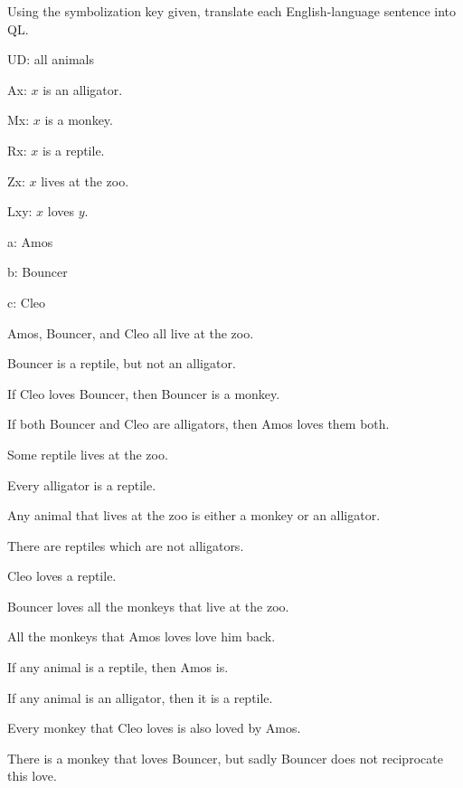 \solutions
\problempart
\label{pr.QLalligators}
Using the symbolization key given, translate each English-language sentence into QL.
\begin{ekey}
\item[UD:] all animals
\item[Ax:] $x$ is an alligator.
\item[Mx:] $x$ is a monkey.
\item[Rx:] $x$ is a reptile.
\item[Zx:] $x$ lives at the zoo.
\item[Lxy:] $x$ loves $y$.
\item[a:] Amos
\item[b:] Bouncer
\item[c:] Cleo
\end{ekey}
\begin{earg}
\item Amos, Bouncer, and Cleo all live at the zoo. 
\item Bouncer is a reptile, but not an alligator. 
\item If Cleo loves Bouncer, then Bouncer is a monkey. 
\item If both Bouncer and Cleo are alligators, then Amos loves them both.
\item Some reptile lives at the zoo. 
\item Every alligator is a reptile. 
\item Any animal that lives at the zoo is either a monkey or an alligator. 
\item There are reptiles which are not alligators.
\item Cleo loves a reptile.
\item Bouncer loves all the monkeys that live at the zoo.
\item All the monkeys that Amos loves love him back.
\item If any animal is a reptile, then Amos is.
\item If any animal is an alligator, then it is a reptile.
\item Every monkey that Cleo loves is also loved by Amos.
\item There is a monkey that loves Bouncer, but sadly Bouncer does not reciprocate this love.
\end{earg}



